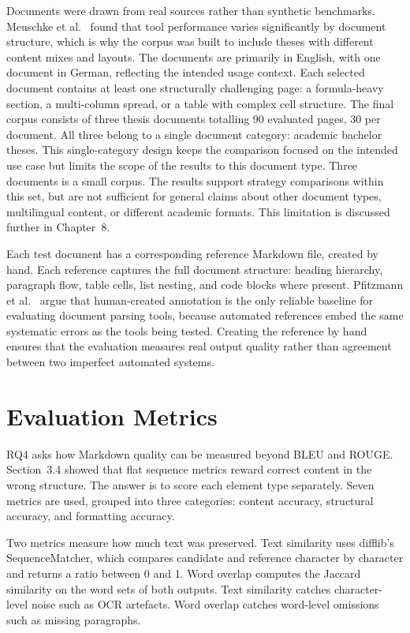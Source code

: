 Documents were drawn from real sources rather than synthetic benchmarks.
Meuschke et al.\ \autocite{meuschke2023} found that tool performance varies
significantly by document structure, which is why the corpus was built to
include theses with different content mixes and layouts. The documents are
primarily in English, with one document in German, reflecting the intended
usage context. Each selected document contains at least one structurally challenging
page: a formula-heavy section, a multi-column spread, or a table with complex
cell structure. The final corpus consists of three thesis documents totalling 90 evaluated
pages, 30 per document. All three belong to a single document category:
academic bachelor theses. This single-category design keeps the
comparison focused on the intended use case but limits the scope of the
results to this document type. Three documents is a small corpus. The
results support strategy comparisons within this set, but are not sufficient
for general claims about other document types, multilingual content, or
different academic formats. This limitation is discussed further in
Chapter~8.

Each test document has a corresponding reference Markdown file, created by
hand. Each reference captures the full document structure: heading hierarchy,
paragraph flow, table cells, list nesting, and code blocks where present.
Pfitzmann et al.\ \autocite{pfitzmann2022} argue that human-created annotation is
the only reliable baseline for evaluating document parsing tools, because
automated references embed the same systematic errors as the tools being
tested. Creating the reference by hand ensures that the evaluation measures
real output quality rather than agreement between two imperfect automated
systems.

\section{Evaluation Metrics}
\label{sec:eval_metrics}

RQ4 asks how Markdown quality can be measured beyond BLEU and ROUGE.
Section~3.4 showed that flat sequence metrics reward correct content in
the wrong structure. The answer is to score each element type separately.
Seven metrics are used, grouped into three categories: content accuracy,
structural accuracy, and formatting accuracy.

Two metrics measure how much text was preserved. Text similarity uses
difflib's SequenceMatcher, which compares candidate and reference character
by character and returns a ratio between 0 and 1. Word overlap computes
the Jaccard similarity on the word sets of both outputs. Text similarity
catches character-level noise such as OCR artefacts. Word overlap catches
word-level omissions such as missing paragraphs.

